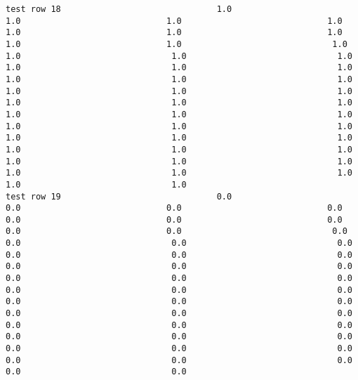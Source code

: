 \documentclass[11pt]{article}
\begin{document}
\begin{verbatim}
test row 18                               1.0                             1.0                             1.0                             1.0                             1.0                             1.0                             1.0                             1.0                             1.0                              1.0                              1.0                              1.0                              1.0                              1.0                              1.0                              1.0                              1.0                              1.0                              1.0                              1.0                              1.0                              1.0                              1.0                              1.0                              1.0                              1.0                              1.0                              1.0                              1.0                              1.0                              1.0                              1.0                              1.0                              1.0                              1.0                              1.0                              1.0                              1.0                              1.0                              1.0                              1.0                              1.0                              1.0                              1.0                              1.0
test row 19                               0.0                             0.0                             0.0                             0.0                             0.0                             0.0                             0.0                             0.0                             0.0                              0.0                              0.0                              0.0                              0.0                              0.0                              0.0                              0.0                              0.0                              0.0                              0.0                              0.0                              0.0                              0.0                              0.0                              0.0                              0.0                              0.0                              0.0                              0.0                              0.0                              0.0                              0.0                              0.0                              0.0                              0.0                              0.0                              0.0                              0.0                              0.0                              0.0                              0.0                              0.0                              0.0                              0.0                              0.0                              0.0

\end{verbatim}
\end{document}

